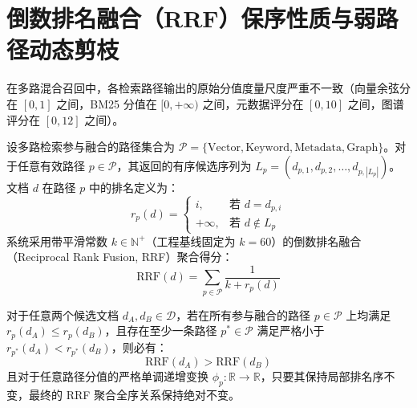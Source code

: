 \section{倒数排名融合（RRF）保序性质与弱路径动态剪枝}

在多路混合召回中，各检索路径输出的原始分值度量尺度严重不一致（向量余弦分在 $[0, 1]$ 之间，BM25 分值在 $[0, +\infty)$ 之间，元数据评分在 $[0, 10]$ 之间，图谱评分在 $[0, 12]$ 之间）。

\begin{definition}[倒数排名融合评分函数]
    设多路检索参与融合的路径集合为 $\mathcal{P} = \{\text{Vector}, \text{Keyword}, \text{Metadata}, \text{Graph}\}$。对于任意有效路径 $p \in \mathcal{P}$，其返回的有序候选序列为 $L_p = (d_{p,1}, d_{p,2}, \ldots, d_{p,|L_p|})$。文档 $d$ 在路径 $p$ 中的排名定义为：
    \begin{equation}
        r_p(d) = \begin{cases}
            i,       & \text{若 } d = d_{p,i}  \\
            +\infty, & \text{若 } d \notin L_p
        \end{cases}
    \end{equation}
    系统采用带平滑常数 $k \in \mathbb{N}^+$（工程基线固定为 $k=60$）的倒数排名融合（Reciprocal Rank Fusion, RRF）聚合得分：
    \begin{equation}
        \text{RRF}(d) = \sum_{p \in \mathcal{P}} \frac{1}{k + r_p(d)}
    \end{equation}
\end{definition}

\begin{proposition}
    \label{prop:rrf_monotone}
    对于任意两个候选文档 $d_A, d_B \in \mathcal{D}$，若在所有参与融合的路径 $p \in \mathcal{P}$ 上均满足 $r_p(d_A) \le r_p(d_B)$，且存在至少一条路径 $p^* \in \mathcal{P}$ 满足严格小于 $r_{p^*}(d_A) < r_{p^*}(d_B)$，则必有：
    \begin{equation}
        \text{RRF}(d_A) > \text{RRF}(d_B)
    \end{equation}
    且对于任意路径分值的严格单调递增变换 $\phi_p: \mathbb{R} \rightarrow \mathbb{R}$，只要其保持局部排名序不变，最终的 RRF 聚合全序关系保持绝对不变。
\end{proposition}

